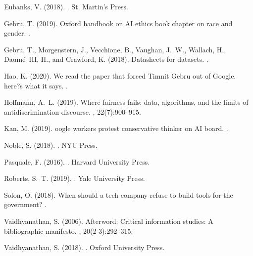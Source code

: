 \documentclass[11pt]{article}
\begin{document}
\begin{thebibliography}{10}
Eubanks, V. (2018).
.
\newblock St. Martin's Press.

Gebru, T. (2019).
\newblock Oxford handbook on {AI} ethics book chapter on race and gender.
.

Gebru, T., Morgenstern, J., Vecchione, B., Vaughan, J.~W., Wallach, H.,
  Daum{\'e}~III, H., and Crawford, K. (2018).
\newblock Datasheets for datasets.
.

Hao, K. (2020).
\newblock We read the paper that forced {T}imnit {G}ebru out of {G}oogle.
  here?s what it says.
.

Hoffmann, A.~L. (2019).
\newblock Where fairness fails: data, algorithms, and the limits of
  antidiscrimination discourse.
, 22(7):900--915.

Kan, M. (2019).
oogle workers protest conservative thinker on {AI} board.
.

Noble, S. (2018).
.
\newblock NYU Press.

Pasquale, F. (2016).
.
\newblock Harvard University Press.

Roberts, S.~T. (2019).
.
\newblock Yale University Press.

Solon, O. (2018).
\newblock When should a tech company refuse to build tools for the government?
.

Vaidhyanathan, S. (2006).
\newblock Afterword: Critical information studies: A bibliographic manifesto.
, 20(2-3):292--315.

Vaidhyanathan, S. (2018).
.
\newblock Oxford University Press.

\end{thebibliography}
\end{document}
